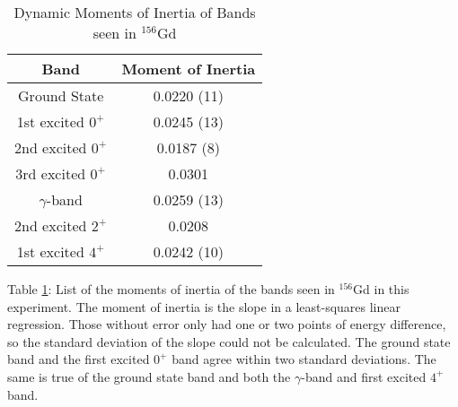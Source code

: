 \begin{table}[!]
    \centering
    \caption{Dynamic Moments of Inertia of Bands seen in $^{156}$Gd}
    \begin{tabular}{c|c}
        \toprule
        Band & Moment of Inertia  \\
        \hline
        Ground State & 0.0220 (11) \\
        1st excited $0^+$ & 0.0245 (13) \\
        2nd excited $0^+$ & 0.0187 (8) \\
        3rd excited $0^+$ & 0.0301 \\
        $\gamma$-band & 0.0259 (13) \\
        2nd excited $2^+$ & 0.0208 \\
        1st excited $4^+$ & 0.0242 (10)  \\
        \bottomrule
    \end{tabular}
    \footnotesize
    \item Table \ref{tab:156_Dynamic}: List of the moments of inertia of the bands seen in $^{156}$Gd in this experiment. The moment of inertia is the slope in a least-squares linear regression. Those without error only had one or two points of energy difference, so the standard deviation of the slope could not be calculated. The ground state band and the first excited $0^+$ band agree within two standard deviations. The same is true of the ground state band and both the $\gamma$-band and first excited $4^+$ band.
    \label{tab:156_Dynamic}
\end{table}